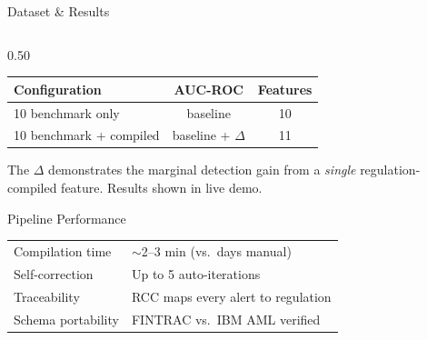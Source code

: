 \documentclass[10pt, aspectratio=169]{beamer}
\begin{document}
\begin{frame}{Dataset \& Results}
\begin{columns}[T]
\begin{column}{0.50\textwidth}
  \vspace{0.3em}
  \begin{center}
  \scriptsize
  \begin{tabular}{lcc}
    \toprule
    \textbf{Configuration} & \textbf{AUC-ROC} & \textbf{Features} \\
    \midrule
    10 benchmark only & baseline & 10 \\
    10 benchmark + compiled & baseline + \(\Delta\) & 11 \\
    \bottomrule
  \end{tabular}
  \end{center}

  \vspace{0.3em}
  \scriptsize
  The \(\Delta\) demonstrates the marginal detection gain from a \textit{single} regulation-compiled feature. Results shown in live demo.

  \vspace{0.5em}
  \begin{block}{Pipeline Performance}
    \scriptsize
    \begin{tabular}{ll}
      Compilation time & $\sim$2--3 min (vs.\ days manual) \\
      Self-correction & Up to 5 auto-iterations \\
      Traceability & RCC maps every alert to regulation \\
      Schema portability & FINTRAC vs.\ IBM AML verified \\
    \end{tabular}
  \end{block}
\end{column}
\end{columns}
\end{frame}
\end{document}
